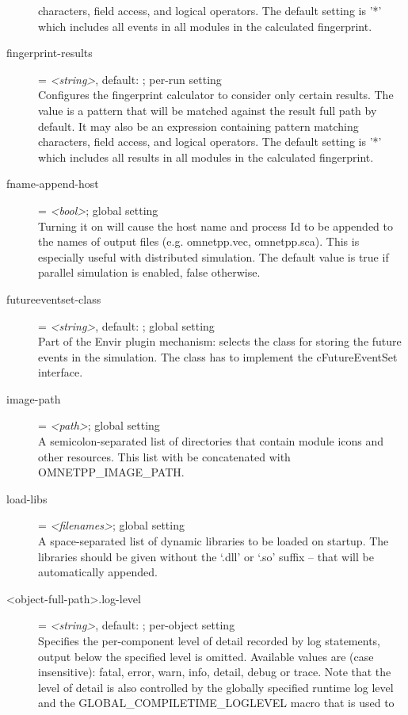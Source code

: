 \begin{description}
    characters, field access, and logical operators. The default setting is '*'
    which includes all events in all modules in the calculated fingerprint.
\item[fingerprint-results] = \textit{<string>}, default: \ttt{*}; per-run setting \\
    Configures the fingerprint calculator to consider only certain results. The
    value is a pattern that will be matched against the result full path by
    default. It may also be an expression containing pattern matching
    characters, field access, and logical operators. The default setting is '*'
    which includes all results in all modules in the calculated fingerprint.
\item[fname-append-host] = \textit{<bool>}; global setting \\
    Turning it on will cause the host name and process Id to be appended to the
    names of output files (e.g. omnetpp.vec, omnetpp.sca). This is especially
    useful with distributed simulation. The default value is true if parallel
    simulation is enabled, false otherwise.
\item[futureeventset-class] = \textit{<string>}, default: ; global setting \\
    Part of the Envir plugin mechanism: selects the class for storing the
    future events in the simulation. The class has to implement the
    cFutureEventSet interface.
\item[image-path] = \textit{<path>}; global setting \\
    A semicolon-separated list of directories that contain module icons and
    other resources. This list with be concatenated with OMNETPP\_IMAGE\_PATH.
\item[load-libs] = \textit{<filenames>}; global setting \\
    A space-separated list of dynamic libraries to be loaded on startup. The
    libraries should be given without the `.dll' or `.so' suffix -- that will
    be automatically appended.
\item[<object-full-path>.log-level] = \textit{<string>}, default: ; per-object setting \\
    Specifies the per-component level of detail recorded by log statements,
    output below the specified level is omitted. Available values are (case
    insensitive): fatal, error, warn, info, detail, debug or trace. Note that
    the level of detail is also controlled by the globally specified runtime
    log level and the GLOBAL\_COMPILETIME\_LOGLEVEL macro that is used to

\end{description}
